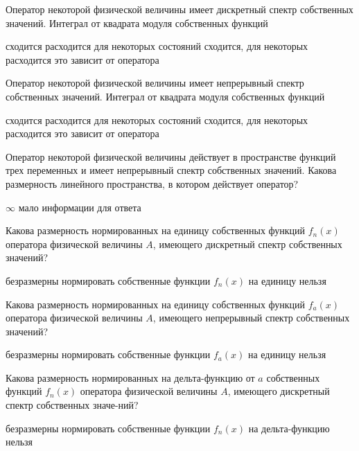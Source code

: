 \documentclass[11pt,a4paper]{exam}
\begin{document}
\begin{questions}

\question Оператор некоторой физической величины имеет дискретный спектр собственных значений. Интеграл от квадрата модуля собственных функций
\begin{choices}
\choice сходится
\choice расходится
\choice для некоторых состояний сходится, для некоторых расходится
\choice это зависит от оператора
\end{choices}

\question Оператор некоторой физической величины имеет непрерывный спектр собственных значений. Интеграл от квадрата модуля собственных функций
\begin{choices}
\choice сходится
\choice расходится
\choice для некоторых состояний сходится, для некоторых расходится
\choice это зависит от оператора
\end{choices}

\question Оператор некоторой физической величины действует в пространстве функций трех переменных и имеет непрерывный спектр собственных значений. Какова размерность линейного пространства, в котором действует оператор?
\begin{choices}
\choice $\infty $       
\choice мало информации для ответа
\end{choices}

\question Какова размерность нормированных на единицу собственных функций ${f_n}(x)$ оператора физической величины $A$, имеющего дискретный спектр собственных значений?
\begin{choices}
\choice        
\choice 
\choice безразмерны     
\choice нормировать собственные функции ${f_n}(x)$ на единицу нельзя
\end{choices}

\question Какова размерность нормированных на единицу собственных функций ${f_a}(x)$ оператора физической величины $A$, имеющего непрерывный спектр собственных значений?
\begin{choices}
\choice        
\choice 
\choice безразмерны     
\choice нормировать собственные функции ${f_a}(x)$ на единицу нельзя
\end{choices}

\question Какова размерность нормированных на дельта-функцию от $a$ собственных функций ${f_n}(x)$ оператора физической величины $A$, имеющего дискретный спектр собственных значе-ний?
\begin{choices}
\choice        
\choice 
\choice безразмерны     
\choice нормировать собственные функции ${f_n}(x)$ на дельта-функцию нельзя
\end{choices}


\end{questions}
\end{document}
